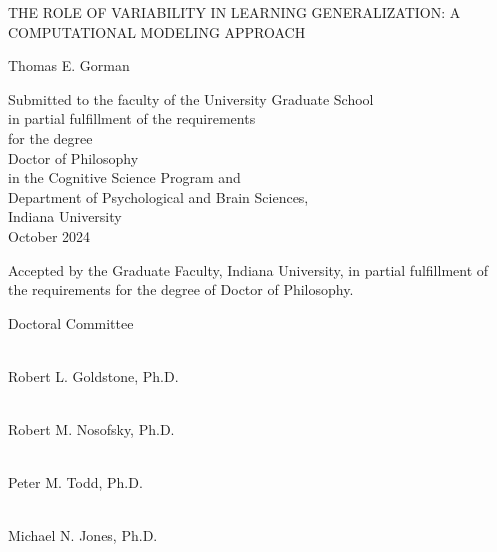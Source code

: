 \documentclass[
  11pt,
  letterpaper,
]{article}
\author{}
\date{2024-10-12}
\begin{document}
\begin{centering}

{THE ROLE OF VARIABILITY IN LEARNING GENERALIZATION: A COMPUTATIONAL MODELING APPROACH}

 
\vspace{5\baselineskip}

{Thomas E. Gorman}

\vspace{10.5cm}



Submitted to the faculty of the University Graduate School \\
in partial fulfillment of the requirements \\
for the degree \\
Doctor of Philosophy \\
in the Cognitive Science Program and \\
Department of Psychological and Brain Sciences, \\
Indiana University \\
October 2024


\vspace{6cm}

\end{centering}

\newpage
{}
\setcounter{page}{2}
\begin{center}

Accepted by the Graduate Faculty, Indiana University, in partial fulfillment of the
requirements for the degree of Doctor of Philosophy.
\end{center}
\vspace{1cm}

\hfill\break
Doctoral Committee \vspace{1cm}

\begin{flushright}
\underline{\hspace{5cm}} \\
Robert L. Goldstone, Ph.D.
\vspace{2cm}

\underline{\hspace{5cm}} \\
Robert M. Nosofsky, Ph.D.
\vspace{2cm}

\underline{\hspace{5cm}} \\
Peter M. Todd, Ph.D.
\vspace{2cm}

\underline{\hspace{5cm}} \\
Michael N. Jones, Ph.D.
\end{flushright}
\end{document}
